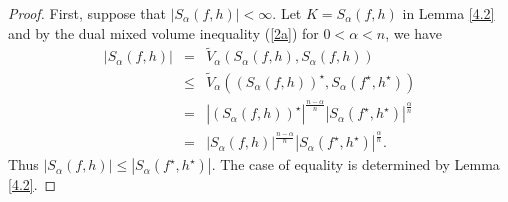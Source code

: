 \documentclass[10pt,a4paper]{amsart}
\begin{document}
\begin{proof}
	First, suppose that $| {S}_{\alpha }(f,h)| < \infty $. Let $K = {S}_{\alpha }(f,h)$ in Lemma \ref{4.2} and by the dual mixed volume inequality (\ref{2a}) for $0 < \alpha < n$, we have
	\begin{eqnarray*}
		| {S}_{\alpha }(f,h)|&=&\widetilde{V}_{\alpha}\left ({S}_{\alpha }(f,h),{S}_{\alpha }(f,h)\right)\nonumber\\
		&\leq& \widetilde{V}_{\alpha}({({S}_{\alpha }(f,h))}^{\star },{S}_{\alpha }(f^{\star },h^{\star }))\nonumber\\
		&=& |({S}_{\alpha }(f,h))^{\star }|^{\frac{n-\alpha }{n}}|{S}_{\alpha }(f^{\star },h^{\star })|^{\frac{\alpha }{n}}\nonumber\\
		&=&|{S}_{\alpha }(f,h)|^{\frac{n-\alpha }{n}}|{S}_{\alpha }(f^{\star },h^{\star })|^{\frac{\alpha }{n}}.
	\end{eqnarray*} 
	Thus $\left | S_{\alpha }\left ( f,h \right )   \right |\le  \left | S_{\alpha }\left ( f^{\star } ,h^{\star }  \right )   \right |$. The case of equality is determined by Lemma \ref{4.2}.
	

\end{proof}
\end{document}
